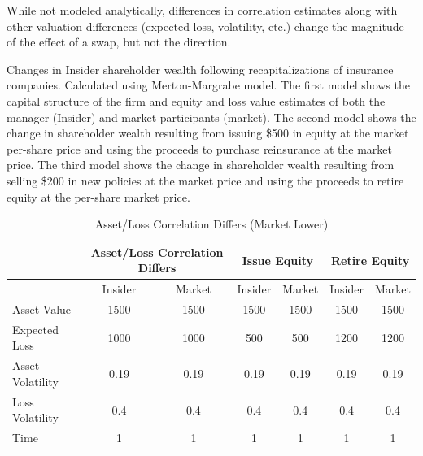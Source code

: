 While not modeled analytically, differences in correlation estimates along with other valuation differences (expected loss, volatility, etc.) change the magnitude of the effect of a swap, but not the direction.

\begin{table}\caption{Asset/Loss Correlation Differs (Market Lower)\label{tab:corrunder}}
\begin{small}Changes in Insider shareholder wealth following recapitalizations of insurance companies.  Calculated using Merton-Margrabe model.  The first model shows the capital structure of the firm and equity and loss value estimates of both the manager (Insider) and market participants (market).  The second model shows the change in shareholder wealth resulting from issuing \$500 in equity at the market per-share price and using the proceeds to purchase reinsurance at the market price.  The third model shows the change in shareholder wealth resulting from selling \$200 in new policies at the market price and using the proceeds to retire equity at the per-share market price.\end{small}
\begin{center}
\begin{tabular}{p{2in}cccccc}
\toprule
           & \multicolumn{ 2}{c}{Asset/Loss Correlation Differs} & \multicolumn{ 2}{c}{Issue Equity} & \multicolumn{ 2}{c}{Retire Equity} \\ 
           
\midrule
           &  Insider &     Market &  Insider &     Market &  Insider &     Market \\ 
\midrule
\midrule
Asset Value &       1500 &       1500 &       1500 &       1500 &       1500 &       1500 \\ 

Expected Loss &       1000 &       1000 &        500 &        500 &       1200 &       1200 \\ 

Asset Volatility &       0.19 &       0.19 &       0.19 &       0.19 &       0.19 &       0.19 \\ 

Loss Volatility &        0.4 &        0.4 &        0.4 &        0.4 &        0.4 &        0.4 \\ 

      Time &          1 &          1 &          1 &          1 &          1 &          1 \\ 


\end{tabular}
\end{center}
\end{table}

